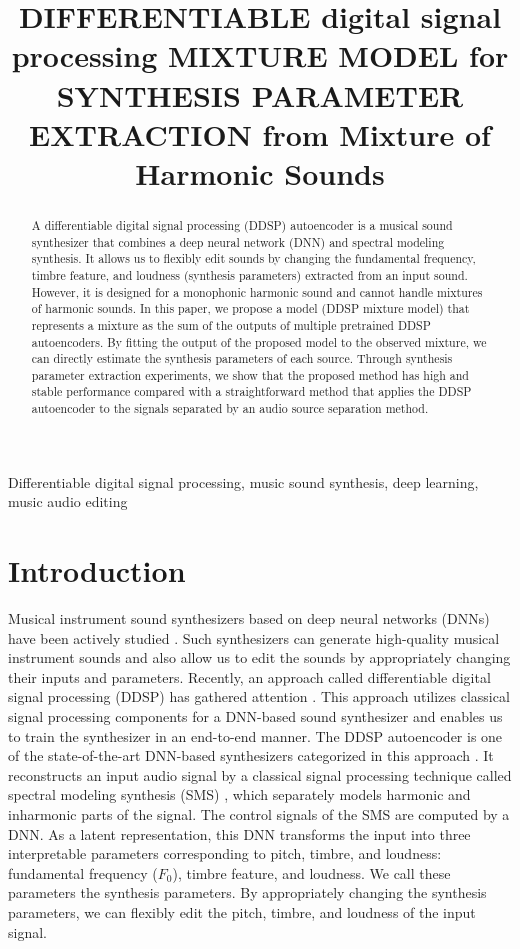 \documentclass{article}
\title{DIFFERENTIABLE digital signal processing MIXTURE MODEL for SYNTHESIS PARAMETER EXTRACTION from Mixture of Harmonic Sounds}
\begin{document}
\ninept

\maketitle

\begin{abstract}
A differentiable digital signal processing (DDSP) autoencoder is a musical sound synthesizer that combines a deep neural network (DNN) and spectral modeling synthesis. It allows us to flexibly edit sounds by changing the fundamental frequency, timbre feature, and loudness (synthesis parameters) extracted from an input sound. However, it is designed for a monophonic harmonic sound and cannot handle mixtures of harmonic sounds. In this paper, we propose a model (DDSP mixture model) that represents a mixture as the sum of the outputs of multiple pretrained DDSP autoencoders. By fitting the output of the proposed model to the observed mixture, we can directly estimate the synthesis parameters of each source. Through synthesis parameter extraction experiments, we show that the proposed method has high and stable performance compared with a straightforward method that applies the DDSP autoencoder to the signals separated by an audio source separation method.

\end{abstract}

\begin{keywords}
Differentiable digital signal processing, music sound synthesis, deep learning, music audio editing
\end{keywords}

\section{Introduction}
\label{sec:intro}

Musical instrument sound synthesizers based on deep neural networks (DNNs) have been actively studied \cite{donahue2018adversarial,newt,htp,drumgan,u_net, crash}.
Such synthesizers can generate high-quality musical instrument sounds and also allow us to edit the sounds by appropriately changing their inputs and parameters.
Recently, an approach called differentiable digital signal processing (DDSP) has gathered attention \cite{ddsp_ref}.
This approach utilizes classical signal processing components for a DNN-based sound synthesizer and enables us to train the synthesizer in an end-to-end manner.
The DDSP autoencoder is one of the state-of-the-art DNN-based synthesizers categorized in this approach \cite{ddsp_ref}.
It reconstructs an input audio signal by a classical signal processing technique called spectral modeling synthesis (SMS) \cite{sms}, which separately models harmonic and inharmonic parts of the signal.
The control signals of the SMS are computed by a DNN.
As a latent representation, this DNN transforms the input into three interpretable parameters corresponding to pitch, timbre, and loudness: fundamental frequency ($F_0$), timbre feature, and loudness.
We call these parameters the synthesis parameters.
By appropriately changing the synthesis parameters, we can flexibly edit the pitch, timbre, and loudness of the input signal.
\end{document}
